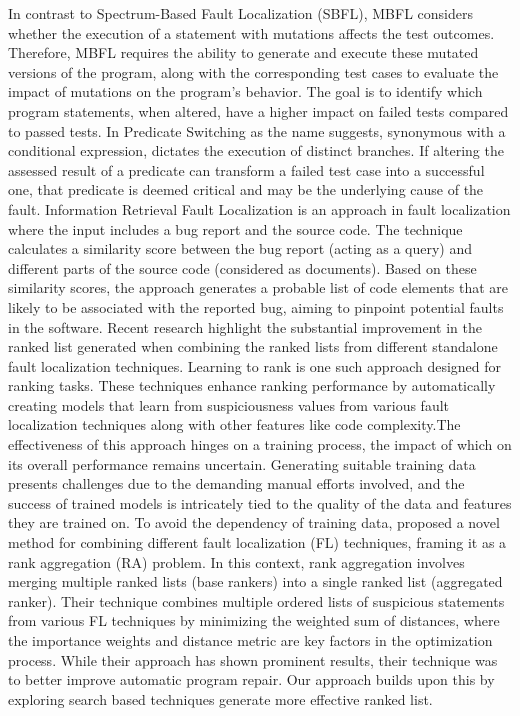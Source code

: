 \documentclass[10pt,conference]{IEEEtran}
\begin{document}
	In contrast to Spectrum-Based Fault Localization (SBFL), MBFL considers whether the execution of a statement with mutations affects the test outcomes. Therefore, MBFL requires the ability to generate and execute these mutated versions of the program, along with the corresponding test cases to evaluate the impact of mutations on the program's behavior. The goal is to identify which program statements, when altered, have a higher impact on failed tests compared to passed tests.
	In Predicate Switching as the name suggests, synonymous with a conditional expression, dictates the execution of distinct branches. If altering the assessed result of a predicate can transform a failed test case into a successful one, that predicate is deemed critical and may be the underlying cause of the fault. Information Retrieval Fault Localization is an approach in fault localization where the input includes a bug report and the source code. The technique calculates a similarity score between the bug report (acting as a query) and different parts of the source code (considered as documents). Based on these similarity scores, the approach generates a probable list of code elements that are likely to be associated with the reported bug, aiming to pinpoint potential faults in the software.
	Recent research\cite{zou2019empirical,motwani2023better,li2019deepfl} highlight the substantial improvement in the ranked list generated when combining the ranked lists from different standalone fault localization techniques. Learning to rank is one such approach designed for ranking tasks. These techniques \cite{li2019deepfl,zou2019empirical} enhance ranking performance by automatically creating models that learn from suspiciousness values from various fault localization techniques along with other features like code complexity.The effectiveness of this approach hinges on a training process, the impact of which on its overall performance remains uncertain. Generating suitable training data presents challenges due to the demanding manual efforts involved, and the success of trained models is intricately tied to the quality of the data and features they are trained on.
	To avoid the dependency of training data,\cite{motwani2023better} proposed a novel method for combining different fault localization (FL) techniques, framing it as a rank aggregation (RA) problem. In this context, rank aggregation involves merging multiple ranked lists (base rankers) into a single ranked list (aggregated ranker). Their technique combines multiple ordered lists of suspicious statements from various FL techniques by minimizing the weighted sum of distances, where the importance weights and distance metric are key factors in the optimization process. While their approach has shown prominent results, their technique was to better improve automatic program repair. Our approach builds upon this by exploring search based techniques generate more effective ranked list.
\end{document}
